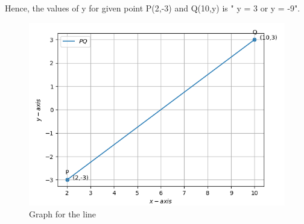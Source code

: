 \documentclass[12pt]{article}
\begin{document}
\begin{enumerate}
    Hence, the values of y for given point P(2,-3) and Q(10,y) is " y = 3 or y = -9".	
\hspace{3mm}
\begin{figure}[!h]
	\begin{center}
	\includegraphics[width=6in]{graph.png}	
	\end{center}
		
\caption{Graph for the line}
\label{fig:Fig}
\end{figure}
\end{enumerate}
\end{document}

